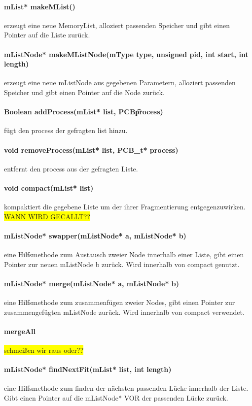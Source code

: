 \paragraph{mList* makeMList()} erzeugt eine neue MemoryList, alloziert passenden Speicher und gibt einen Pointer auf die Liste zurück.

\paragraph{mListNode* makeMListNode(mType type, unsigned pid, int start, int length)} erzeugt eine neue mListNode aus gegebenen Parametern, alloziert passenden Speicher und gibt einen Pointer auf die Node zurück.

\paragraph{Boolean addProcess(mList* list, PCB\t* process)} fügt den process der gefragten list hinzu.

\paragraph{void removeProcess(mList* list, PCB\_t* process)} entfernt den process aus der gefragten Liste.

\paragraph{void compact(mList* list)} kompaktiert die gegebene Liste um der ihrer Fragmentierung entgegenzuwirken. \colorbox{yellow}{WANN WIRD GECALLT??}

\paragraph{mListNode* swapper(mListNode* a, mListNode* b)} eine Hilfsmethode zum Austausch zweier Node innerhalb einer Liste, gibt einen Pointer zur neuen mListNode b zurück. Wird innerhalb von compact genutzt.

\paragraph{mListNode* merge(mListNode* a, mListNode* b)} eine Hilfsmethode zum zusammenfügen zweier Nodes, gibt einen Pointer zur zusammengefügten mListNode zurück. Wird innerhalb von compact verwendet.

\paragraph{mergeAll}\colorbox{yellow}{schmeißen wir raus oder??}

\paragraph{mListNode* findNextFit(mList* list, int length)} eine Hilfsmethode zum finden der nächsten passenden Lücke innerhalb der Liste. Gibt einen Pointer auf die mListNode* VOR der passenden Lücke zurück. 